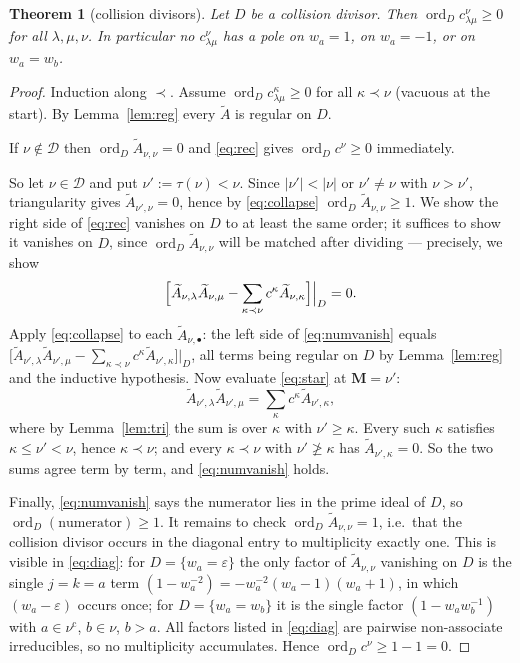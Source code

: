 \documentclass[11pt]{article}
\theoremstyle{plain}
\newtheorem{thm}{Theorem}
\theoremstyle{definition}
\theoremstyle{remark}
\theoremstyle{plain}
\newcommand{\bM}{\mathbf{M}}
\newcommand{\At}{\widetilde{A}}
\newcommand{\ord}{\operatorname{ord}}
\begin{document}
\begin{thm}[collision divisors]\label{thm:collision}
Let $D$ be a collision divisor.  Then $\ord_D c^{\nu}_{\lambda\mu}\ge0$ for all
$\lambda,\mu,\nu$.  In particular no $c^{\nu}_{\lambda\mu}$ has a pole on
$w_a=1$, on $w_a=-1$, or on $w_a=w_b$.
\end{thm}
\begin{proof}
Induction along $\prec$.  Assume $\ord_Dc^{\kappa}_{\lambda\mu}\ge0$ for all
$\kappa\prec\nu$ (vacuous at the start).  By Lemma~\ref{lem:reg} every $\At$ is
regular on $D$.

If $\nu\notin\mathcal{D}$ then $\ord_D\At_{\nu,\nu}=0$ and \eqref{eq:rec} gives
$\ord_Dc^{\nu}\ge0$ immediately.

So let $\nu\in\mathcal{D}$ and put $\nu':=\tau(\nu)<\nu$.  Since
$|\nu'|<|\nu|$ or $\nu'\ne\nu$ with $\nu>\nu'$, triangularity gives
$\At_{\nu',\nu}=0$, hence by \eqref{eq:collapse}
$\ord_D\At_{\nu,\nu}\ge1$.  We show the right side of \eqref{eq:rec} vanishes on
$D$ to at least the same order; it suffices to show it vanishes on $D$, since
$\ord_D\At_{\nu,\nu}$ will be matched after dividing --- precisely, we show
\begin{equation}
\Bigl[\At_{\nu,\lambda}\At_{\nu,\mu}-\sum_{\kappa\prec\nu}c^{\kappa}\At_{\nu,\kappa}\Bigr]
\Big|_D=0 .
\label{eq:numvanish}
\end{equation}
Apply \eqref{eq:collapse} to each $\At_{\nu,\bullet}$:
the left side of \eqref{eq:numvanish} equals
$\bigl[\At_{\nu',\lambda}\At_{\nu',\mu}-\sum_{\kappa\prec\nu}c^{\kappa}
\At_{\nu',\kappa}\bigr]|_D$, all terms being regular on $D$ by
Lemma~\ref{lem:reg} and the inductive hypothesis.  Now evaluate \eqref{eq:star}
at $\bM=\nu'$:
\[
\At_{\nu',\lambda}\At_{\nu',\mu}=\sum_{\kappa}c^{\kappa}\At_{\nu',\kappa},
\]
where by Lemma~\ref{lem:tri} the sum is over $\kappa$ with $\nu'\ge\kappa$.
Every such $\kappa$ satisfies $\kappa\le\nu'<\nu$, hence $\kappa\prec\nu$; and
every $\kappa\prec\nu$ with $\nu'\not\ge\kappa$ has $\At_{\nu',\kappa}=0$.  So
the two sums agree term by term, and \eqref{eq:numvanish} holds.

Finally, \eqref{eq:numvanish} says the numerator lies in the prime ideal of
$D$, so $\ord_D(\text{numerator})\ge1$.  It remains to check
$\ord_D\At_{\nu,\nu}=1$, i.e.\ that the collision divisor occurs in the
diagonal entry to multiplicity exactly one.  This is visible in
\eqref{eq:diag}: for $D=\{w_a=\varepsilon\}$ the only factor of
$\At_{\nu,\nu}$ vanishing on $D$ is the single $j=k=a$ term
$(1-w_a^{-2})=-w_a^{-2}(w_a-1)(w_a+1)$, in which $(w_a-\varepsilon)$ occurs once;
for $D=\{w_a=w_b\}$ it is the single factor $(1-w_aw_b^{-1})$ with
$a\in\nu^{\mathrm c}$, $b\in\nu$, $b>a$.  All factors listed in
\eqref{eq:diag} are pairwise non-associate irreducibles, so no multiplicity
accumulates.  Hence $\ord_Dc^{\nu}\ge1-1=0$.
\end{proof}
\end{document}
